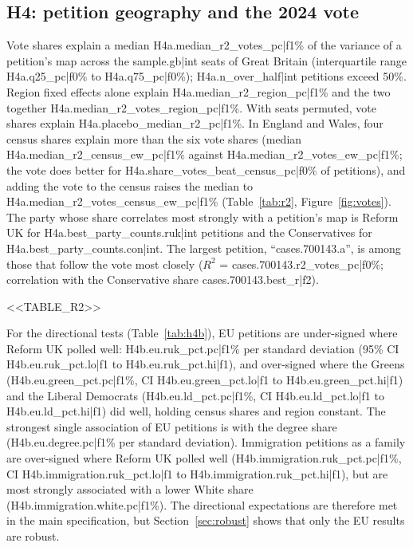 \documentclass[11pt,a4paper]{article}
\begin{document}
\subsection{H4: petition geography and the 2024 vote}\label{sec:votes}
Vote shares explain a median {{H4a.median_r2_votes_pc|f1}}\% of the variance of a petition's map across the {{sample.gb|int}} seats of Great Britain (interquartile range {{H4a.q25_pc|f0}}\% to {{H4a.q75_pc|f0}}\%); {{H4a.n_over_half|int}} petitions exceed 50\%. Region fixed effects alone explain {{H4a.median_r2_region_pc|f1}}\% and the two together {{H4a.median_r2_votes_region_pc|f1}}\%. With seats permuted, vote shares explain {{H4a.placebo_median_r2_pc|f1}}\%. In England and Wales, four census shares explain more than the six vote shares (median {{H4a.median_r2_census_ew_pc|f1}}\% against {{H4a.median_r2_votes_ew_pc|f1}}\%; the vote does better for {{H4a.share_votes_beat_census_pc|f0}}\% of petitions), and adding the vote to the census raises the median to {{H4a.median_r2_votes_census_ew_pc|f1}}\% (Table~\ref{tab:r2}, Figure~\ref{fig:votes}). The party whose share correlates most strongly with a petition's map is Reform UK for {{H4a.best_party_counts.ruk|int}} petitions and the Conservatives for {{H4a.best_party_counts.con|int}}. The largest petition, ``{{cases.700143.a}}'', is among those that follow the vote most closely ($R^2$ = {{cases.700143.r2_votes_pc|f0}}\%; correlation with the Conservative share {{cases.700143.best_r|f2}}).

<<TABLE_R2>>

For the directional tests (Table~\ref{tab:h4b}), EU petitions are under-signed where Reform UK polled well: {{H4b.eu.ruk_pct.pc|f1}}\% per standard deviation (95\% CI {{H4b.eu.ruk_pct.lo|f1}} to {{H4b.eu.ruk_pct.hi|f1}}), and over-signed where the Greens ({{H4b.eu.green_pct.pc|f1}}\%, CI {{H4b.eu.green_pct.lo|f1}} to {{H4b.eu.green_pct.hi|f1}}) and the Liberal Democrats ({{H4b.eu.ld_pct.pc|f1}}\%, CI {{H4b.eu.ld_pct.lo|f1}} to {{H4b.eu.ld_pct.hi|f1}}) did well, holding census shares and region constant. The strongest single association of EU petitions is with the degree share ({{H4b.eu.degree.pc|f1}}\% per standard deviation). Immigration petitions as a family are over-signed where Reform UK polled well ({{H4b.immigration.ruk_pct.pc|f1}}\%, CI {{H4b.immigration.ruk_pct.lo|f1}} to {{H4b.immigration.ruk_pct.hi|f1}}), but are most strongly associated with a lower White share ({{H4b.immigration.white.pc|f1}}\%). The directional expectations are therefore met in the main specification, but Section~\ref{sec:robust} shows that only the EU results are robust.
\end{document}
